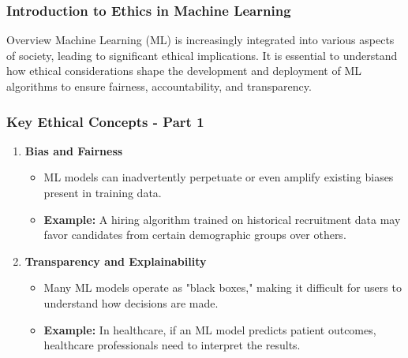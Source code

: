 \documentclass[aspectratio=169]{beamer}
\begin{document}
\frame{\titlepage}

\begin{frame}[fragile]
    \frametitle{Introduction to Ethics in Machine Learning}
    
    \begin{block}{Overview}
        Machine Learning (ML) is increasingly integrated into various aspects of society, leading to significant ethical implications. It is essential to understand how ethical considerations shape the development and deployment of ML algorithms to ensure fairness, accountability, and transparency.
    \end{block}
\end{frame}

\begin{frame}[fragile]
    \frametitle{Key Ethical Concepts - Part 1}

    \begin{enumerate}
        \item \textbf{Bias and Fairness}
        \begin{itemize}
            \item ML models can inadvertently perpetuate or even amplify existing biases present in training data.
            \item \textbf{Example:} A hiring algorithm trained on historical recruitment data may favor candidates from certain demographic groups over others.
        \end{itemize}

        \item \textbf{Transparency and Explainability}
        \begin{itemize}
            \item Many ML models operate as "black boxes," making it difficult for users to understand how decisions are made.
            \item \textbf{Example:} In healthcare, if an ML model predicts patient outcomes, healthcare professionals need to interpret the results.
        \end{itemize}
    \end{enumerate}
\end{frame}
\end{document}
